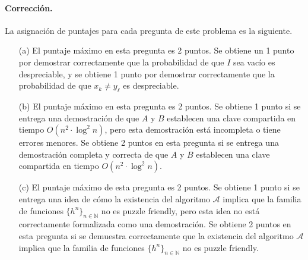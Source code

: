 \paragraph{Corrección.}
La asignación de puntajes para cada pregunta de este problema es la siguiente.
\begin{itemize}
\item[(a)] El puntaje máximo en esta pregunta es 2 puntos. Se obtiene un 1 punto por demostrar correctamente que la probabilidad de que $I$ sea vacío es despreciable, y se obtiene 1 punto por demostrar correctamente que la probabilidad de que $x_k \neq y_\ell$ es despreciable.

\item[(b)] El puntaje máximo en esta pregunta es 2 puntos. Se obtiene 1 punto si se entrega una demostración de que $A$ y $B$ establecen una clave compartida en tiempo $O(n^2 \cdot \log^2 n)$, pero esta demostración está incompleta o tiene errores menores. Se obtiene 2 puntos en esta pregunta si se entrega una demostración completa y correcta de que $A$ y $B$ establecen una clave compartida en tiempo $O(n^2 \cdot \log^2 n)$.

\item[(c)] El puntaje máximo de esta pregunta es 2 puntos. Se obtiene 1 punto si se entrega una idea de cómo la existencia del algoritmo $\mathcal{A}$ implica que la familia de funciones $\{h^n\}_{n \in \mathbb{N}}$ no es puzzle friendly, pero esta idea no está correctamente formalizada como una demostración. Se obtiene 2 puntos en esta pregunta si se demuestra correctamente que la existencia del algoritmo $\mathcal{A}$ implica que la familia de funciones $\{h^n\}_{n \in \mathbb{N}}$ no es puzzle friendly. 
\end{itemize}

